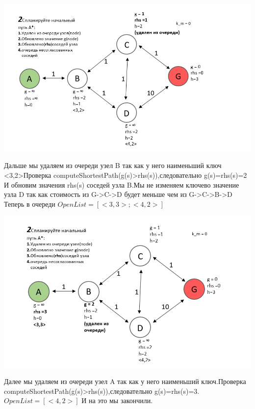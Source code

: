 \documentclass[12pt]{article}
\begin{document}
\begin{center}
        \includegraphics[width=1\textwidth]{img/example2_2.png}
    \end{center}
Дальше мы удаляем из очереди узел B так как у него наименьший ключ <3,2>Проверка computeShortestPath(g(s)>rhs(s)),следовательно g(s)=rhs(s)=2 И обновим значения rhs(s) соседей узла B.Мы не изменяем ключево значение узла D так как стоимость из G->C->D будет меньше чем из G->C->B->D
\\Теперь в очереди $OpenList=[<3,3>;<4,2>]$
\begin{center}
        \includegraphics[width=1\textwidth]{img/example2_3.png}
    \end{center}
Далее мы удаляем из очереди узел A так как у него наименьший ключ.Проверка computeShortestPath(g(s)>rhs(s)),следовательно g(s)=rhs(s)=3. $OpenList=[<4,2>]$ И на это мы закончили.
\end{document}
